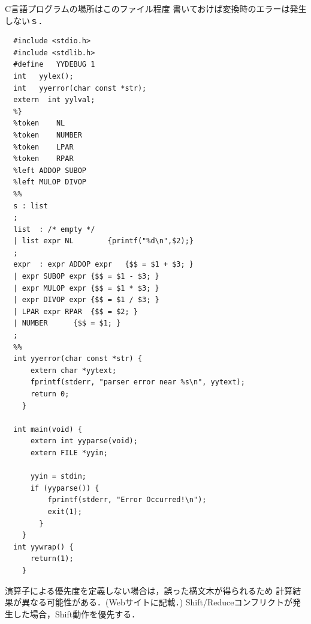 \documentclass[a4j,dvipdfmx]{jbook}
\begin{document}
C言語プログラムの場所はこのファイル程度
書いておけば変換時のエラーは発生しないｓ．

\begin{Verbatim}[frame=single]
  %{
  #include <stdio.h>
  #include <stdlib.h>
  #define	YYDEBUG 1
  int	yylex();
  int	yyerror(char const *str);
  extern  int yylval;
  %}
  %token	NL
  %token	NUMBER
  %token	LPAR
  %token	RPAR
  %left	ADDOP SUBOP
  %left	MULOP DIVOP
  %%
  s	: list
  ;
  list	: /* empty */
  | list expr NL		{printf("%d\n",$2);}
  ;
  expr	: expr ADDOP expr	{$$ = $1 + $3; }
  | expr SUBOP expr	{$$ = $1 - $3; }
  | expr MULOP expr	{$$ = $1 * $3; }
  | expr DIVOP expr	{$$ = $1 / $3; }
  | LPAR expr RPAR	{$$ = $2; }
  | NUMBER		{$$ = $1; }
  ;
  %%
  int yyerror(char const *str) {
      extern char *yytext;
      fprintf(stderr, "parser error near %s\n", yytext);
      return 0;
    }

  int main(void) {
      extern int yyparse(void);
      extern FILE *yyin;

      yyin = stdin;
      if (yyparse()) {
          fprintf(stderr, "Error Occurred!\n");
          exit(1);
        }
    }
  int yywrap() {
      return(1);
    }
\end{Verbatim}

演算子による優先度を定義しない場合は，誤った構文木が得られるため
計算結果が異なる可能性がある．(Webサイトに記載．)
Shift/Reduceコンフリクトが発生した場合，Shift動作を優先する．
\end{document}
